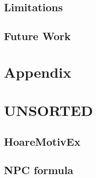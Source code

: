 \section{Limitations}
\label{sec:limitations}


\section{Future Work}
\label{sec:future-work}


\chapter{Appendix}


\chapter{UNSORTED}

\section{HoareMotivEx}
\label{sec:hoaremotivex}


\section{NPC formula}
\label{sec:npc-formula}
